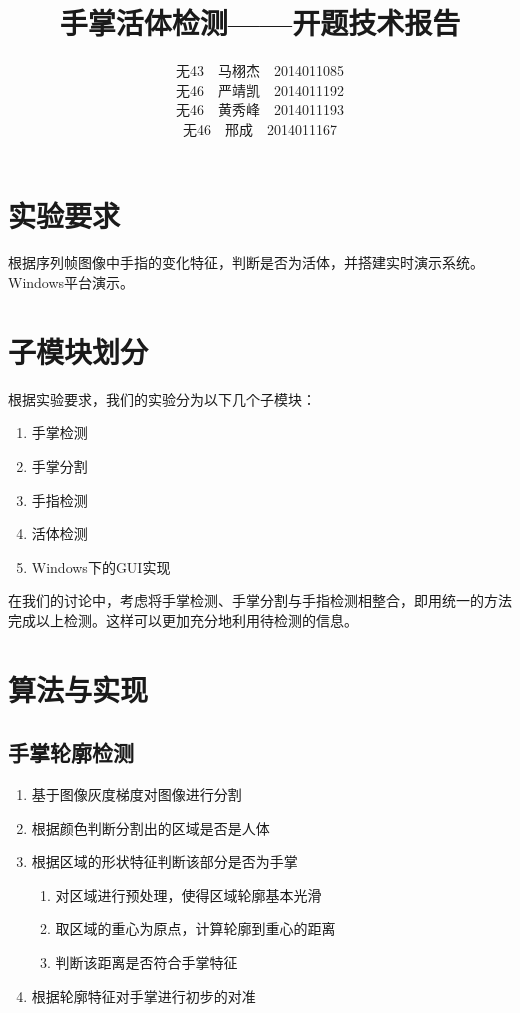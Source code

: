 \documentclass[UTF8]{ctexart}
\begin{document}
\title{手掌活体检测——开题技术报告}
\author{无43\ \ 马栩杰\ \ 2014011085\\ 无46\ \ 严靖凯\ \ 2014011192\\ 无46\ \ 黄秀峰\ \ 2014011193\\ 无46\ \ 邢成\ \ 2014011167}
\maketitle

\section{实验要求}

	根据序列帧图像中手指的变化特征，判断是否为活体，并搭建实时演示系统。Windows平台演示。

\section{子模块划分}

	根据实验要求，我们的实验分为以下几个子模块：

	\begin{enumerate}
		\item 手掌检测
		\item 手掌分割
		\item 手指检测
		\item 活体检测
		\item Windows下的GUI实现
	\end{enumerate}

	在我们的讨论中，考虑将手掌检测、手掌分割与手指检测相整合，即用统一的方法完成以上检测。这样可以更加充分地利用待检测的信息。

\section{算法与实现}

	\subsection{手掌轮廓检测}

		\begin{enumerate}
			\item 基于图像灰度梯度对图像进行分割
			\item 根据颜色判断分割出的区域是否是人体
			\item 根据区域的形状特征判断该部分是否为手掌
				\begin{enumerate}
				  \item 对区域进行预处理，使得区域轮廓基本光滑
					\item 取区域的重心为原点，计算轮廓到重心的距离
					\item 判断该距离是否符合手掌特征
				\end{enumerate}
			\item 根据轮廓特征对手掌进行初步的对准
		\end{enumerate}
\end{document}
